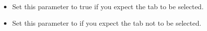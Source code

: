 
\begin{itemize}
\item Set this parameter to true if you expect the tab to be selected.
\item Set this parameter to \gdrefbooleanfalse if you expect the tab not to be selected.
\end{itemize}
